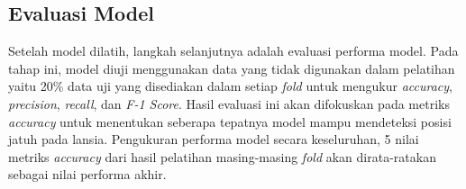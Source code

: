 

\subsection{Evaluasi Model} \label{III.evaluasi}
Setelah model dilatih, langkah selanjutnya adalah evaluasi performa model. Pada tahap ini, model diuji menggunakan data yang tidak digunakan dalam pelatihan yaitu 20\% data uji yang disediakan dalam setiap \textit{fold} untuk mengukur  \textit{accuracy}, \textit{precision}, \textit{recall}, dan \textit{F-1 Score}. Hasil evaluasi ini akan difokuskan pada metriks \textit{accuracy} untuk menentukan seberapa tepatnya model mampu mendeteksi posisi jatuh pada lansia. Pengukuran performa model secara keseluruhan, 5 nilai metriks  \textit{accuracy} dari hasil pelatihan masing-masing \textit{fold} akan dirata-ratakan sebagai nilai performa akhir. \par

